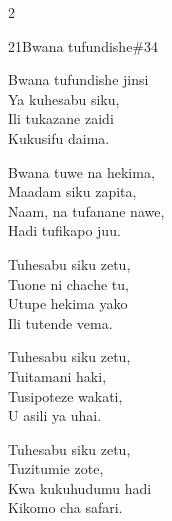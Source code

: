\begin{multicols}{2}
\begin{hymn}{21}{Bwana tufundishe}{\#34}
\begin{stanza}
Bwana tufundishe jinsi\\
Ya kuhesabu siku,\\
Ili tukazane zaidi\\
Kukusifu daima.
\end{stanza}
\begin{chorus}
Bwana tuwe na hekima,\\
Maadam siku zapita,\\
Naam, na tufanane nawe,\\
Hadi tufikapo juu.
\end{chorus}
\begin{stanza}
Tuhesabu siku zetu,\\
Tuone ni chache tu,\\
Utupe hekima yako\\
Ili tutende vema.
\end{stanza}
\begin{stanza}
Tuhesabu siku zetu,\\
Tuitamani haki,\\
Tusipoteze wakati,\\
U asili ya uhai.
\end{stanza}
\begin{stanza}
Tuhesabu siku zetu,\\
Tuzitumie zote,\\
Kwa kukuhudumu hadi\\
Kikomo cha safari.
\end{stanza}
\end{hymn}


\end{multicols}
